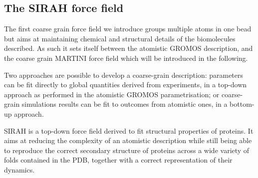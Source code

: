 \subsection{The SIRAH force field}

The first coarse grain force field we introduce groups multiple atoms in one bead but aims at maintaining chemical and structural details of the biomolecules described. As such it sets itself between the atomistic GROMOS description, and the coarse grain MARTINI force field \cite{Marrink2007,Monticelli2008,DeJong2013} which will be introduced in the following.

Two approaches are possible to develop a coarse-grain description: parameters can be fit directly to global quantities derived from experiments, in a top-down approach as performed in the atomistic GROMOS parametrisation; or coarse-grain simulations results can be fit to outcomes from atomistic ones, in a bottom-up approach.

SIRAH \cite{Machado2018,Barrera2019} is a top-down force field derived to fit structural properties of proteins. It aims at reducing the complexity of an atomistic description while still being able to reproduce the correct secondary structure of proteins across a wide variety of folds contained in the PDB, together with a correct representation of their dynamics.

